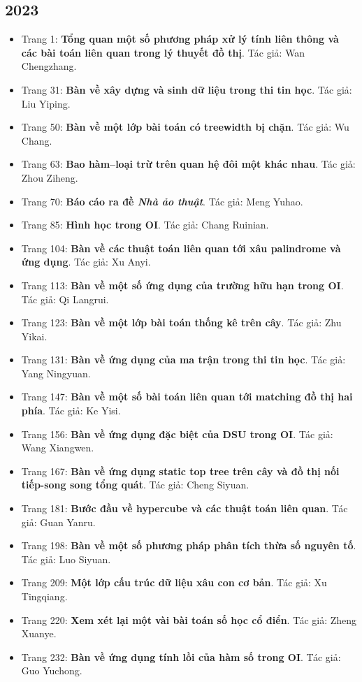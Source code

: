 \documentclass[11pt]{article}
\begin{document}
\subsection{2023}
\begin{itemize}[leftmargin=2em]
  \item Trang 1: \textbf{Tổng quan một số phương pháp xử lý tính liên thông và các bài toán liên quan trong lý thuyết đồ thị}. Tác giả: Wan Chengzhang.
  \item Trang 31: \textbf{Bàn về xây dựng và sinh dữ liệu trong thi tin học}. Tác giả: Liu Yiping.
  \item Trang 50: \textbf{Bàn về một lớp bài toán có treewidth bị chặn}. Tác giả: Wu Chang.
  \item Trang 63: \textbf{Bao hàm--loại trừ trên quan hệ đôi một khác nhau}. Tác giả: Zhou Ziheng.
  \item Trang 70: \textbf{Báo cáo ra đề \emph{Nhà ảo thuật}}. Tác giả: Meng Yuhao.
  \item Trang 85: \textbf{Hình học trong OI}. Tác giả: Chang Ruinian.
  \item Trang 104: \textbf{Bàn về các thuật toán liên quan tới xâu palindrome và ứng dụng}. Tác giả: Xu Anyi.
  \item Trang 113: \textbf{Bàn về một số ứng dụng của trường hữu hạn trong OI}. Tác giả: Qi Langrui.
  \item Trang 123: \textbf{Bàn về một lớp bài toán thống kê trên cây}. Tác giả: Zhu Yikai.
  \item Trang 131: \textbf{Bàn về ứng dụng của ma trận trong thi tin học}. Tác giả: Yang Ningyuan.
  \item Trang 147: \textbf{Bàn về một số bài toán liên quan tới matching đồ thị hai phía}. Tác giả: Ke Yisi.
  \item Trang 156: \textbf{Bàn về ứng dụng đặc biệt của DSU trong OI}. Tác giả: Wang Xiangwen.
  \item Trang 167: \textbf{Bàn về ứng dụng static top tree trên cây và đồ thị nối tiếp-song song tổng quát}. Tác giả: Cheng Siyuan.
  \item Trang 181: \textbf{Bước đầu về hypercube và các thuật toán liên quan}. Tác giả: Guan Yanru.
  \item Trang 198: \textbf{Bàn về một số phương pháp phân tích thừa số nguyên tố}. Tác giả: Luo Siyuan.
  \item Trang 209: \textbf{Một lớp cấu trúc dữ liệu xâu con cơ bản}. Tác giả: Xu Tingqiang.
  \item Trang 220: \textbf{Xem xét lại một vài bài toán số học cổ điển}. Tác giả: Zheng Xuanye.
  \item Trang 232: \textbf{Bàn về ứng dụng tính lồi của hàm số trong OI}. Tác giả: Guo Yuchong.
\end{itemize}
\end{document}
